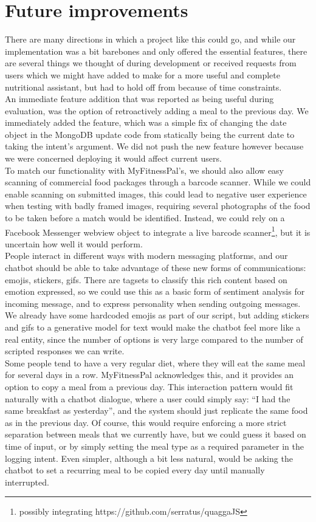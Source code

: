 \section{Future improvements} 
There are many directions in which a project like this could go, and while our implementation was a bit barebones and only offered the essential features, there are several things we thought of during development or received requests from users which we might have added to make for a more useful and complete nutritional assistant, but had to hold off from because of time constraints. \\
An immediate feature addition that was reported as being useful during evaluation, was the option of retroactively adding a meal to the previous day. We immediately added the feature, which was a simple fix of changing the date object in the MongoDB update code from statically being the current date to taking the intent's argument. We did not push the new feature however because we were concerned deploying it would affect current users. \\
To match our functionality with MyFitnessPal's, we should also allow easy scanning of commercial food packages through a barcode scanner. While we could enable scanning on submitted images, this could lead to negative user experience when testing with badly framed images, requiring several photographs of the food to be taken before a match would be identified. Instead, we could rely on a Facebook Messenger webview object to integrate a live barcode scanner\footnote{possibly integrating https://github.com/serratus/quaggaJS}, but it is uncertain how well it would perform. \\
People interact in different ways with modern messaging platforms, and our chatbot should be able to take advantage of these new forms of communications: emojis, stickers, gifs. There are tagsets to classify this rich content based on emotion expressed, so we could use this as a basic form of sentiment analysis for incoming message, and to express personality when sending outgoing messages. We already have some hardcoded emojis as part of our script, but adding stickers and gifs to a generative model for text would make the chatbot feel more like a real entity, since the number of options is very large compared to the number of scripted responses we can write. \\
Some people tend to have a very regular diet, where they will eat the same meal for several days in a row. MyFitnessPal acknowledges this, and it provides an option to copy a meal from a previous day. This interaction pattern would fit naturally with a chatbot dialogue, where a user could simply say: ``I had the same breakfast as yesterday'', and the system should just replicate the same food as in the previous day. Of course, this would require enforcing a more strict separation between meals that we currently have, but we could guess it based on time of input, or by simply setting the meal type as a required parameter in the logging intent. Even simpler, although a bit less natural, would be asking the chatbot to set a recurring meal to be copied every day until manually interrupted. \\
